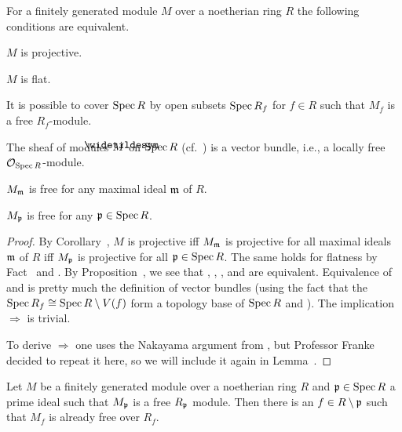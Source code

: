 \documentclass[a4paper,parskip=half,numbers=enddot, DIV=12]{scrreprt}
\begin{document}
\begin{prop}
	For a finitely generated module $M$ over a noetherian ring $R$ the following conditions are equivalent.
	\begin{alphanumerate}
		\item $M$ is projective.
		\item $M$ is flat.
		\item It is possible to cover $\operatorname{Spec} R$ by open subsets $\operatorname{Spec} R_{f}$ for $f\in R$ such that $M_f$ is a free $R_f$-module.
		\item The sheaf of modules $\snake{M}$ on $\operatorname{Spec} R$ (cf.\ \cite[Definition~1.4.1]{alggeo1}) is a vector bundle, i.e., a locally free $\mathcal{O}_{\operatorname{Spec} R}$-module.
		\item $M_{\mathfrak{m}}$ is free for any maximal ideal $\mathfrak{m}$ of $R$.
		\item $M_{\mathfrak{p}}$ is free for any $\mathfrak{p}\in\operatorname{Spec} R$.
	\end{alphanumerate}
\end{prop}
\begin{proof}
	By Corollary~, $M$ is projective iff $M_{\mathfrak{m}}$ is projective for all maximal ideals $\mathfrak{m}$ of $R$ iff $M_{\mathfrak{p}}$ is projective for all $\mathfrak{p}\in\operatorname{Spec} R$. The same holds for flatness by Fact~ and . By Proposition~, we see that , , , and  are equivalent. Equivalence of  and  is pretty much the definition of vector bundles (using the fact that the $\operatorname{Spec} R_f\cong \operatorname{Spec} R\setminus V(f)$ form a topology base of $\operatorname{Spec} R$ and \cite[Proposition~1.4.1]{alggeo1}). The implication  $\Rightarrow$  is trivial. 
	
	To derive  $\Rightarrow$  one uses the Nakayama argument from \cite[Corollary~1.5.1]{alg2}, but Professor Franke decided to repeat it here, so we will include it again in Lemma~.
\end{proof}
\begin{lem}
	Let $M$ be a finitely generated module over a noetherian ring $R$ and $\mathfrak{p}\in\operatorname{Spec} R$ a prime ideal such that $M_{\mathfrak{p}}$ is a free $R_{\mathfrak{p}}$ module. Then there is an $f\in R\setminus\mathfrak{p}$ such that $M_f$ is already free over $R_f$.
\end{lem}
\end{document}

